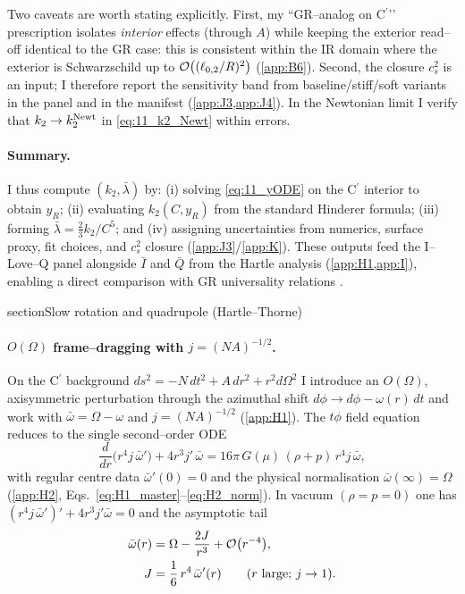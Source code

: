 \documentclass{iopjournal}
\begin{document}
Two caveats are worth stating explicitly. First, my ``GR–analog on C$^\prime$’’ prescription isolates \emph{interior} effects (through $A$) while keeping the exterior read–off identical to the GR case: this is consistent within the IR domain where the exterior is Schwarzschild up to $\order{(\ell_{0,2}/R)^2}$ (\cref{app:B6}). Second, the closure $c_s^2$ is an input; I therefore report the sensitivity band from baseline/stiff/soft variants in the panel and in the manifest (\cref{app:J3,app:J4}). In the Newtonian limit I verify that $k_2\to k_2^{\rm Newt}$ in \eqref{eq:11_k2_Newt} within errors.

\paragraph{Summary.}
I thus compute $(k_2,\bar\lambda)$ by: (i) solving \eqref{eq:11_yODE} on the C$^\prime$ interior to obtain $y_R$; (ii) evaluating $k_2(C,y_R)$ from the standard Hinderer formula; (iii) forming $\bar\lambda= \tfrac{2}{3}k_2/C^5$; and (iv) assigning uncertainties from numerics, surface proxy, fit choices, and $c_s^2$ closure (\cref{app:J3}/\cref{app:K}). These outputs feed the I–Love–Q panel alongside $\bar{I}$ and $\bar{Q}$ from the Hartle analysis (\cref{app:H1,app:I}), enabling a direct comparison with GR universality relations \cite{Hinderer2008,DamourNagar2009,PoissonWill2014}.

section{Slow rotation and quadrupole (Hartle–Thorne)}\label{sec:rotation}
\paragraph{$O(\Omega)$ frame–dragging with $j=(NA)^{-1/2}$.}
On the C$^\prime$ background \(ds^2=-N\,dt^2+A\,dr^2+r^2d\Omega^2\) I introduce an $O(\Omega)$, axisymmetric perturbation through the azimuthal shift \(d\phi\to d\phi-\omega(r)\,dt\) and work with \(\bar\omega=\Omega-\omega\) and \(j=(NA)^{-1/2}\) (\cref{app:H1}). The $t\phi$ field equation reduces to the single second–order ODE
\begin{equation}
\frac{d}{dr}\!\Big(r^{4}j\,\bar\omega'\Big)+4r^{3}j'\,\bar\omega
=16\pi\,G(\mu)\,(\rho+p)\,r^{4}j\,\bar\omega,
\label{eq:12_o1_eq}
\end{equation}
with regular centre data \(\bar\omega'(0)=0\) and the physical normalisation \(\bar\omega(\infty)=\Omega\) (\cref{app:H2}, Eqs.~\eqref{eq:H1_master}–\eqref{eq:H2_norm}). In vacuum \((\rho=p=0)\) one has \((r^{4}j\,\bar\omega')'+4r^{3}j'\bar\omega=0\) and the asymptotic tail
\begin{equation}
\begin{aligned}
\bar{\omega}(r) &= \Omega - \frac{2J}{r^{3}} + \order{r^{-4}},\\
J &= \frac{1}{6}\, r^{4}\,\bar{\omega}'(r) \qquad (r \text{ large; } j \to 1).
\end{aligned}
\label{eq:12_tail}
\end{equation}
\end{document}
